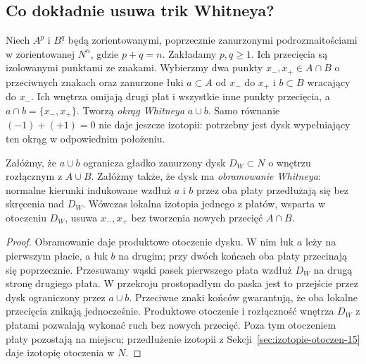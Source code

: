 \subsection*{Co dokładnie usuwa trik Whitneya?}
Niech $A^p$ i $B^q$ będą zorientowanymi,
poprzecznie zanurzonymi podrozmaitościami
w zorientowanej $N^n$, gdzie $p+q=n$.
Zakładamy $p,q\geq1$.
Ich przecięcia są izolowanymi punktami ze znakami.
Wybierzmy dwa punkty $x_-,x_+\in A\cap B$
o przeciwnych znakach oraz zanurzone łuki
$a\subset A$ od $x_-$ do $x_+$
i $b\subset B$ wracający do $x_-$.
Ich wnętrza omijają drugi płat i wszystkie
inne punkty przecięcia, a $a\cap b=\{x_-,x_+\}$.
Tworzą \emph{okrąg Whitneya} $a\cup b$.
Samo równanie $(-1)+(+1)=0$ nie daje jeszcze
izotopii: potrzebny jest dysk wypełniający ten
okrąg w odpowiednim położeniu.

\begin{stwierdzenie}
\label{prop:lokalny-Whitney-21}
Załóżmy, że $a\cup b$ ogranicza gładko zanurzony
dysk $D_W\subset N$ o wnętrzu rozłącznym z
$A\cup B$. Załóżmy także, że dysk ma
\emph{obramowanie Whitneya}: normalne kierunki
indukowane wzdłuż $a$ i $b$ przez oba płaty
przedłużają się bez skręcenia nad $D_W$.
Wówczas lokalna izotopia jednego z płatów,
wsparta w otoczeniu $D_W$, usuwa $x_-,x_+$
bez tworzenia nowych przecięć $A\cap B$.
\end{stwierdzenie}
\begin{proof}
Obramowanie daje produktowe otoczenie dysku.
W nim łuk $a$ leży na pierwszym płacie,
a łuk $b$ na drugim; przy dwóch końcach
oba płaty przecinają się poprzecznie.
Przesuwamy wąski pasek pierwszego płata
wzdłuż $D_W$ na drugą stronę drugiego płata.
W przekroju prostopadłym do paska jest to
przejście przez dysk ograniczony przez $a\cup b$.
Przeciwne znaki końców gwarantują, że oba
lokalne przecięcia znikają jednocześnie.
Produktowe otoczenie i rozłączność wnętrza
$D_W$ z płatami pozwalają wykonać ruch bez
nowych przecięć. Poza tym otoczeniem płaty
pozostają na miejscu; przedłużenie izotopii
z Sekcji~\ref{sec:izotopie-otoczen-15}
daje izotopię otoczenia w $N$.
\end{proof}

